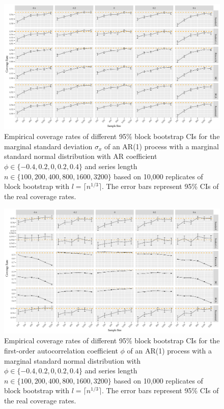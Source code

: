 \documentclass[12pt]{article}
\begin{document}
\begin{figure}[bp]
  \centering
  \includegraphics[width=\textwidth]{figures/plot_norm_sigma_1}
  \caption{Empirical coverage rates of different 95\% block bootstrap CIs for
    the marginal standard deviation $\sigma_x$ of an AR(1) process with a
    marginal standard normal distribution with AR 
    coefficient $\phi \in \{-0.4, 0.2, 0, 0.2, 0.4\}$ and series length 
    $n \in \{100, 200, 400, 800, 1600, 3200\}$ based on 10,000 replicates of
    block bootstrap with $l = \lceil n^{1/3} \rceil$. The 
    error bars represent 95\% CIs of the real coverage rates.}
  \label{fig:sigma1}
\end{figure}


\begin{figure}[tbp]
  \centering
  \includegraphics[width=\textwidth]{figures/plot_norm_phi_1}
  \caption{Empirical coverage rates of different 95\% block bootstrap CIs for 
    the first-order autocorrelation coefficient $\phi$ of an AR(1) process with 
    a marginal standard normal distribution with 
    $\phi \in \{-0.4, 0.2, 0, 0.2, 0.4\}$ and series length
    $n \in \{100, 200, 400, 800, 1600, 3200\}$ based on 10,000 replicates of
    block bootstrap with $l = \lceil n^{1/3} \rceil$. The
    error bars represent 95\% CIs of the real coverage rates.}
  \label{fig:phi1}
\end{figure}
\end{document}

